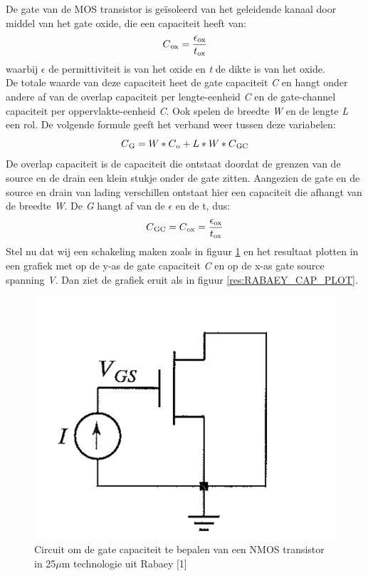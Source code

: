 

De gate van de MOS transistor is ge\"isoleerd van het geleidende kanaal door middel van het gate oxide, die een capaciteit heeft van:
\begin{equation}
C\textsubscript{ox} = \frac{\epsilon\textsubscript{ox}}{t\textsubscript{ox}}
\end{equation} 
waarbij \emph{$\epsilon$} de permittiviteit is van het oxide en \emph{t} de dikte is van het oxide.
\\
De totale waarde van deze capaciteit heet de gate capaciteit \emph{C} en hangt onder andere af van de overlap capaciteit per lengte-eenheid \emph{C} en de gate-channel capaciteit per oppervlakte-eenheid \emph{C}. Ook spelen de breedte \emph{W} en de lengte \emph{L} een rol. De volgende formule geeft het verband weer tussen deze variabelen:
\begin{equation}
C\textsubscript{G} = W \ast C\textsubscript{o} + L \ast W \ast C\textsubscript{GC}
\end{equation}
De overlap capaciteit is de capaciteit die ontstaat doordat de grenzen van de source en de drain een klein stukje onder de gate zitten. Aangezien de gate en de source en drain van lading verschillen ontstaat hier een capaciteit die afhangt van de breedte \emph{W}. De \emph{G} hangt af van de \emph{$\epsilon$} en de t, dus:
\begin{equation}
C\textsubscript{GC} = C\textsubscript{ox} = \frac{\epsilon\textsubscript{ox}}{t\textsubscript{ox}}
\end{equation}
Stel nu dat wij een schakeling maken zoals in figuur \ref{res:RABAEY_SCHAKELING} en het resultaat plotten in een grafiek met op de y-as de gate capaciteit \emph{C} en op de x-as gate source spanning \emph{V}. Dan ziet de grafiek eruit als in figuur \ref{res:RABAEY_CAP_PLOT}.

 \begin{figure} [h!]
 \begin{center}
 \includegraphics [scale = 0.7] {figures/RABAEY_SCHAKELING}
 \caption{Circuit om de gate capaciteit te bepalen van een NMOS transistor in 25$\mu$m technologie uit Rabaey [1]}
 \label{res:RABAEY_SCHAKELING}
 \end{center}
 \end{figure}

